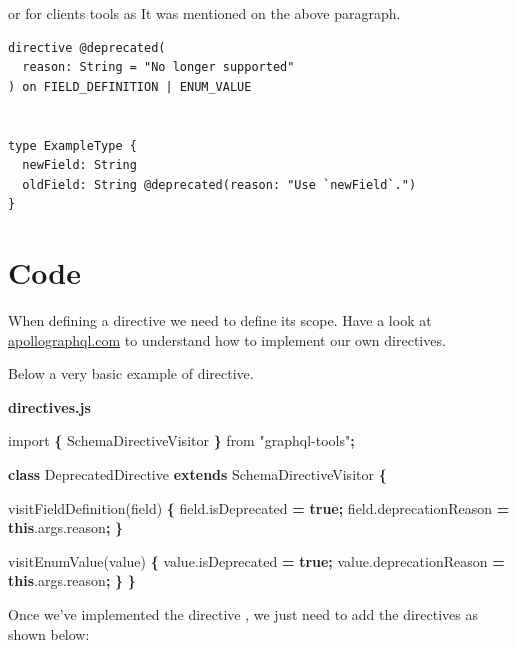 \documentclass[]{book}
\newenvironment{Shaded}{\begin{snugshade}}{\end{snugshade}}
\newcommand{\KeywordTok}[1]{\textcolor[rgb]{0.13,0.29,0.53}{\textbf{#1}}}
\newcommand{\StringTok}[1]{\textcolor[rgb]{0.31,0.60,0.02}{#1}}
\newcommand{\ImportTok}[1]{#1}
\newcommand{\VariableTok}[1]{\textcolor[rgb]{0.00,0.00,0.00}{#1}}
\newcommand{\OperatorTok}[1]{\textcolor[rgb]{0.81,0.36,0.00}{\textbf{#1}}}
\newcommand{\AttributeTok}[1]{\textcolor[rgb]{0.77,0.63,0.00}{#1}}
\newcommand{\NormalTok}[1]{#1}
\begin{document}
or for clients tools as It was mentioned on the above paragraph.

\begin{verbatim}
directive @deprecated(
  reason: String = "No longer supported"
) on FIELD_DEFINITION | ENUM_VALUE


type ExampleType {
  newField: String
  oldField: String @deprecated(reason: "Use `newField`.")
}
\end{verbatim}

\section{Code}\label{code-3}

When defining a directive we need to define its scope. Have a look at
\href{https://www.apollographql.com/docs/graphql-tools/schema-directives.html}{apollographql.com}
to understand how to implement our own directives.

Below a very basic example of directive.

\textbf{directives.js}

\begin{Shaded}
\begin{Highlighting}[]
\ImportTok{import} \OperatorTok{\{}\NormalTok{ SchemaDirectiveVisitor }\OperatorTok{\}} \ImportTok{from} \StringTok{"graphql-tools"}\OperatorTok{;}

\KeywordTok{class}\NormalTok{ DeprecatedDirective }\KeywordTok{extends}\NormalTok{ SchemaDirectiveVisitor }\OperatorTok{\{}
  
  \AttributeTok{visitFieldDefinition}\NormalTok{(field) }\OperatorTok{\{}
    \VariableTok{field}\NormalTok{.}\AttributeTok{isDeprecated} \OperatorTok{=} \KeywordTok{true}\OperatorTok{;}
    \VariableTok{field}\NormalTok{.}\AttributeTok{deprecationReason} \OperatorTok{=} \KeywordTok{this}\NormalTok{.}\VariableTok{args}\NormalTok{.}\AttributeTok{reason}\OperatorTok{;}
  \OperatorTok{\}}

  \AttributeTok{visitEnumValue}\NormalTok{(value) }\OperatorTok{\{}
    \VariableTok{value}\NormalTok{.}\AttributeTok{isDeprecated} \OperatorTok{=} \KeywordTok{true}\OperatorTok{;}
    \VariableTok{value}\NormalTok{.}\AttributeTok{deprecationReason} \OperatorTok{=} \KeywordTok{this}\NormalTok{.}\VariableTok{args}\NormalTok{.}\AttributeTok{reason}\OperatorTok{;}
  \OperatorTok{\}}
\OperatorTok{\}}
\end{Highlighting}
\end{Shaded}

Once we've implemented the directive , we just need to add the
directives as shown below:
\end{document}

